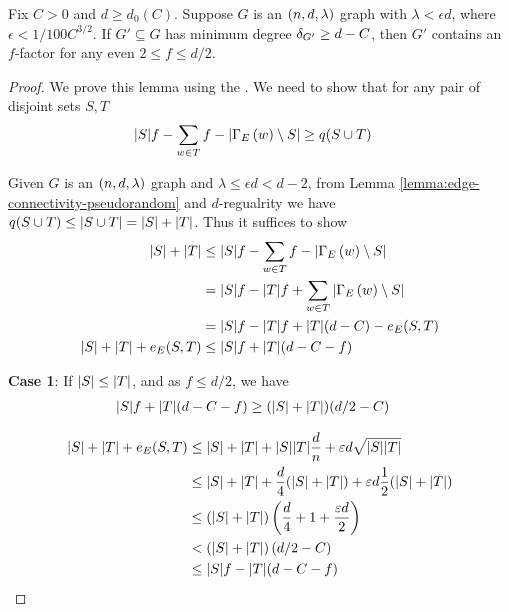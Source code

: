 \documentclass[11pt]{article}
\begin{document}
\begin{lemma}\label{lemma:f-factor}
  Fix $C > 0$ and $d \ge d_0(C)$.
Suppose $G$ is an $\EnDeeLambda$ graph with $\lambda < \epsilon d$, where $\epsilon < 1/100C^{3/2}$.
If $G' \subseteq G$ has minimum degree $\MinimalDegree{G'} \ge d - C$, then $G'$ contains an $f$-factor for any even $2 \le f \le d/2$.
\end{lemma}

\begin{proof}
  We prove this lemma using the .
  We need to show that for any pair of disjoint sets $S, T$
  \begin{align}
   |S|f - \sum_{w \in T} f - \Size{\Neighbourhood{E}{w} \setminus S} &\ge  \OddComponents{S \cup T}
  \end{align}

  Given $G$ is an $\EnDeeLambda$ graph and $\lambda \leq \epsilon d < d-2$, from Lemma \ref{lemma:edge-connectivity-pseudorandom} and $d$-regualrity we have  $\OddComponents{S \cup T} \le \Size{S \cup T} = |S| + |T|$.
  Thus it suffices to show
  \begin{align}
    |S| + |T| &\le |S|f - \sum_{w \in T} f - \Size{\Neighbourhood{E}{w} \setminus S}   \\
              &= \Size{S}f - \Size{T}f + \sum_{w\in T}\Size{\Neighbourhood{E}{w} \setminus S} \\
              &=\Size{S}f - \Size{T}f + \Size{T}(d-C) - \CutEdges{S}{T}{E}  \\
|S| + |T| + \CutEdges{S}{T}{E} &\le  \Size{S}f + \Size{T}(d-C-f)  \label{eq:to-show}
  \end{align}  

  \textbf{Case 1}: If $\Size{S} \leq \Size{T}$, and as $f \leq d/2$, we have 
  \begin{align}
    \Size{S}f + \Size{T}(d-C-f)  &\ge (\Size{S} + \Size{T})(d/2 -C) \label{eq:to-show-1}
  \end{align}

\begin{align}
  |S| + |T| + \CutEdges{S}{T}{E} &\le  |S| + |T| + |S||T|\frac{d}{n} + \epsilon d \sqrt{\Size{S}\Size{T}} \label{eq:eml}\\
                                 &\le |S| + |T| + \frac{d}{4}(\Size{S} + \Size{T}) + \epsilon d \frac{1}{2}(\Size{S} + \Size{T}) \label{eq:algebra}\\
                                 &\le (\Size{S} + \Size{T})\left(\frac{d}{4} + 1 + \frac{
                                   \epsilon d}{2}\right) \\
                                 &<  (\Size{S} + \Size{T})\left(d/2-C\right) \label{eq:eps-assumption}\\
                                 &\le \Size{S}f - \Size{T}(d-C-f) \label{eq:plug}
 \end{align}  
  

\end{proof}
\end{document}
